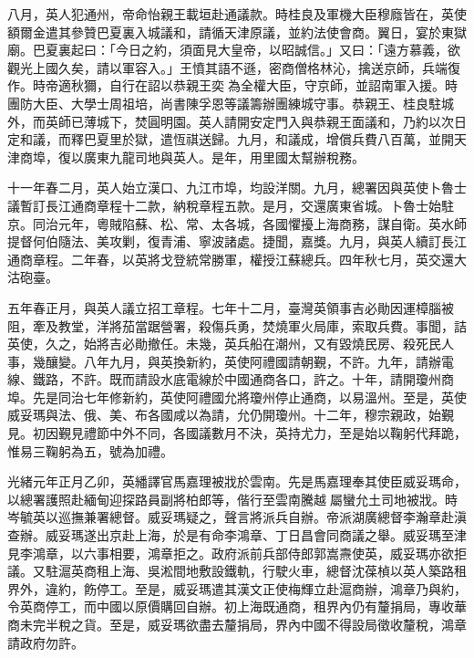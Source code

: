 \begin{pinyinscope}
八月，英人犯通州，帝命怡親王載垣赴通議款。時桂良及軍機大臣穆廕皆在，英使額爾金遣其參贊巴夏裏入城議和，請循天津原議，並約法使會商。翼日，宴於東獄廟。巴夏裏起曰：「今日之約，須面見大皇帝，以昭誠信。」又曰：「遠方慕義，欲觀光上國久矣，請以軍容入。」王憤其語不遜，密商僧格林沁，擒送京師，兵端復作。時帝適秋獮，自行在詔以恭親王奕為全權大臣，守京師，並詔南軍入援。時團防大臣、大學士周祖培，尚書陳孚恩等議籌辦團練城守事。恭親王、桂良駐城外，而英師已薄城下，焚圓明園。英人請開安定門入與恭親王面議和，乃約以次日定和議，而釋巴夏里於獄，遣恆祺送歸。九月，和議成，增償兵費八百萬，並開天津商埠，復以廣東九龍司地與英人。是年，用里國太幫辦稅務。

十一年春二月，英人始立漢口、九江市埠，均設洋關。九月，總署因與英使卜魯士議暫訂長江通商章程十二款，納稅章程五款。是月，交還廣東省城。卜魯士始駐京。同治元年，粵賊陷蘇、松、常、太各城，各國懼擾上海商務，謀自衛。英水師提督何伯隨法、美攻剿，復青浦、寧波諸處。捷聞，嘉獎。九月，與英人續訂長江通商章程。二年春，以英將戈登統常勝軍，權授江蘇總兵。四年秋七月，英交還大沽砲臺。

五年春正月，與英人議立招工章程。七年十二月，臺灣英領事吉必勛因運樟腦被阻，牽及教堂，洋將茄當踞營署，殺傷兵勇，焚燒軍火局庫，索取兵費。事聞，詰英使，久之，始將吉必勛撤任。未幾，英兵船在潮州，又有毀燒民房、殺死民人事，幾釀變。八年九月，與英換新約，英使阿禮國請朝覲，不許。九年，請辦電線、鐵路，不許。既而請設水底電線於中國通商各口，許之。十年，請開瓊州商埠。先是同治七年修新約，英使阿禮國允將瓊州停止通商，以易溫州。至是，英使威妥瑪與法、俄、美、布各國咸以為請，允仍開瓊州。十二年，穆宗親政，始覲見。初因覲見禮節中外不同，各國議數月不決，英持尤力，至是始以鞠躬代拜跪，惟易三鞠躬為五，號為加禮。

光緒元年正月乙卯，英繙譯官馬嘉理被戕於雲南。先是馬嘉理奉其使臣威妥瑪命，以總署護照赴緬甸迎探路員副將柏郎等，偕行至雲南騰越屬蠻允土司地被戕。時岑毓英以巡撫兼署總督。威妥瑪疑之，聲言將派兵自辦。帝派湖廣總督李瀚章赴滇查辦。威妥瑪遂出京赴上海，於是有命李鴻章、丁日昌會同商議之舉。威妥瑪至津見李鴻章，以六事相要，鴻章拒之。政府派前兵部侍郎郭嵩燾使英，威妥瑪亦欲拒議。又駐滬英商租上海、吳淞間地敷設鐵軌，行駛火車，總督沈葆楨以英人築路租界外，違約，飭停工。至是，威妥瑪遣其漢文正使梅輝立赴滬商辦，鴻章乃與約，令英商停工，而中國以原價購回自辦。初上海既通商，租界內仍有釐捐局，專收華商未完半稅之貨。至是，威妥瑪欲盡去釐捐局，界內中國不得設局徵收釐稅，鴻章請政府勿許。


\end{pinyinscope}
